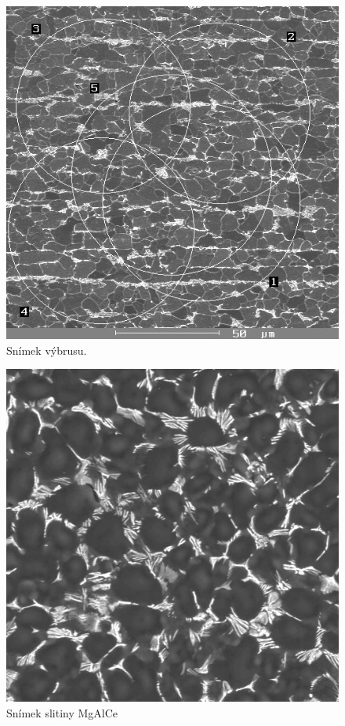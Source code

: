 \documentclass[a4paper,12pt]{article}
\begin{document}
\begin{figure}[!htb]
\begin{center}
\includegraphics[scale=.7]{B3.png}
\end{center}
\caption{Snímek výbrusu.}
\label{o3}
\end{figure}

\begin{figure}[!htb]
\begin{center}
\includegraphics[scale=.7]{B4.png}
\end{center}
\caption{Snímek slitiny MgAlCe}
\label{o4}
\end{figure}
\end{document}
